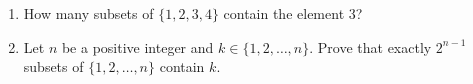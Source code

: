 \begin{enumerate}
\item[(a)] How many subsets of $\{1,2,3,4\}$ contain the element $3$?
\item[(b)] Let $n$ be a positive integer and $k\in\{1,2,\ldots,n\}$. Prove that exactly $2^{n-1}$ subsets of $\{1,2,\ldots,n\}$ contain $k$.
\end{enumerate}
